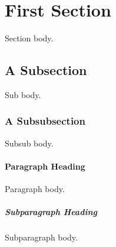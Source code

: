\section{First Section}

Section body.

\subsection{A Subsection}

Sub body.

\subsubsection{A Subsubsection}

Subsub body.

\paragraph{Paragraph Heading}

Paragraph body.

\subparagraph{Subparagraph Heading}

Subparagraph body.
